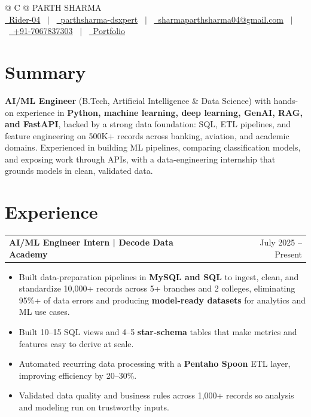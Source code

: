 \documentclass[a4paper,12pt]{article}
\makeatletter
\newenvironment{joblong}[2]
    {
    \begin{tabularx}{\linewidth}{@{}l X r@{}}
    \textbf{#1} & \hfill &  #2 \\[3.75pt]
    \end{tabularx}
    \begin{minipage}[t]{\linewidth}
    \begin{itemize}[nosep,after=\strut, leftmargin=1em, itemsep=3pt,label=--]
    }
    {
    \end{itemize}
    \end{minipage}
    }
\makeatother
\begin{document}
\pagestyle{empty}

\begin{tabularx}{\linewidth}{@{} C @{}}
\Huge{PARTH SHARMA} \\[7.5pt]
\href{https://github.com/Rider-04}{\raisebox{-0.05\height}\faGithub\ Rider-04} \ $|$ \
\href{https://www.linkedin.com/in/parthsharma-dsxpert}{\raisebox{-0.05\height}\faLinkedin\ parthsharma-dsxpert} \ $|$ \
\href{mailto:sharmaparthsharma04@gmail.com}{\raisebox{-0.05\height}\faEnvelope \ sharmaparthsharma04@gmail.com} \ $|$ \
\href{tel:+917067837303}{\raisebox{-0.05\height}\faMobile \ +91-7067837303} \ $|$ \
\href{https://parth-portfolio-virid.vercel.app/}{\raisebox{-0.05\height}\faGlobe \ Portfolio}\end{tabularx}


\section{Summary}
\textbf{AI/ML Engineer} (B.Tech, Artificial Intelligence \& Data Science) with hands-on experience in \textbf{Python, machine learning, deep learning, GenAI, RAG, and FastAPI}, backed by a strong data foundation: SQL, ETL pipelines, and feature engineering on 500K+ records across banking, aviation, and academic domains. Experienced in building ML pipelines, comparing classification models, and exposing work through APIs, with a data-engineering internship that grounds models in clean, validated data.

\section{Experience}

\begin{joblong}{AI/ML Engineer Intern | Decode Data Academy}{July 2025 -- Present}
\item Built data-preparation pipelines in \textbf{MySQL and SQL} to ingest, clean, and standardize 10,000+ records across 5+ branches and 2 colleges, eliminating 95\%+ of data errors and producing \textbf{model-ready datasets} for analytics and ML use cases.
\item Built 10--15 SQL views and 4--5 \textbf{star-schema} tables that make metrics and features easy to derive at scale.
\item Automated recurring data processing with a \textbf{Pentaho Spoon} ETL layer, improving efficiency by 20--30\%.
\item Validated data quality and business rules across 1,000+ records so analysis and modeling run on trustworthy inputs.
\vspace{10pt}
\end{joblong}
\end{document}

